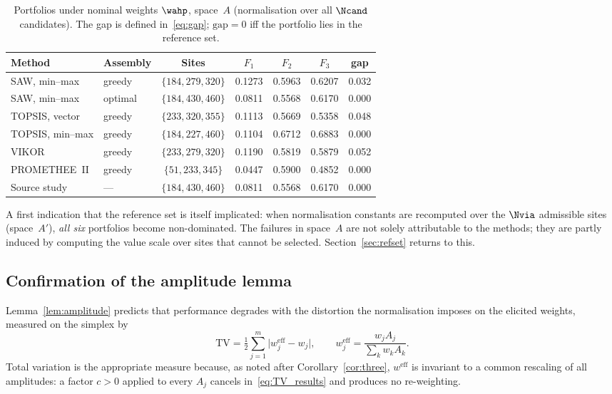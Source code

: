 \begin{table}[t]
\centering
\caption{Portfolios under nominal weights $\wahp$, space~$A$
  (normalisation over all $\Ncand$ candidates). The gap is defined
  in~\eqref{eq:gap}; $\mathrm{gap}=0$ iff the portfolio lies in the
  reference set.}
\label{tab:canonical}
\begin{tabular*}{\textwidth}{@{\extracolsep{\fill}}llccccc}
\toprule
Method & Assembly & Sites & $F_1$ & $F_2$ & $F_3$ & gap \\
\midrule
SAW, min--max     & greedy  & $\{184,279,320\}$ & 0.1273 & 0.5963 & 0.6207 & 0.032 \\
SAW, min--max     & optimal & $\{184,430,460\}$ & 0.0811 & 0.5568 & 0.6170 & 0.000 \\
TOPSIS, vector    & greedy  & $\{233,320,355\}$ & 0.1113 & 0.5669 & 0.5358 & 0.048 \\
TOPSIS, min--max  & greedy  & $\{184,227,460\}$ & 0.1104 & 0.6712 & 0.6883 & 0.000 \\
VIKOR             & greedy  & $\{233,279,320\}$ & 0.1190 & 0.5819 & 0.5879 & 0.052 \\
PROMETHEE~II      & greedy  & $\{51,233,345\}$  & 0.0447 & 0.5900 & 0.4852 & 0.000 \\
\midrule
Source study      & ---     & $\{184,430,460\}$ & 0.0811 & 0.5568 & 0.6170 & 0.000 \\
\bottomrule
\end{tabular*}
\end{table}

A first indication that the reference set is itself implicated: when
normalisation constants are recomputed over the $\Nvia$ admissible sites
(space~$A'$), \emph{all six} portfolios become non-dominated.
The failures in space~$A$ are not solely attributable to the methods;
they are partly induced by computing the value scale over sites that
cannot be selected.
Section~\ref{sec:refset} returns to this.

\subsection{Confirmation of the amplitude lemma}
\label{sec:lemmaconf}

Lemma~\ref{lem:amplitude} predicts that performance degrades with the
distortion the normalisation imposes on the elicited weights, measured
on the simplex by
\begin{equation}
  \label{eq:TV_results}
  \mathrm{TV} = \tfrac12\sum_{j=1}^{m}\bigl|w_j^{\mathrm{eff}}-w_j\bigr|,
  \qquad
  w_j^{\mathrm{eff}} = \frac{w_j A_j}{\sum_k w_k A_k}.
\end{equation}
Total variation is the appropriate measure because, as noted after
Corollary~\ref{cor:three}, $w^{\mathrm{eff}}$ is invariant to a common
rescaling of all amplitudes: a factor $c>0$ applied to every $A_j$
cancels in~\eqref{eq:TV_results} and produces no re-weighting.

